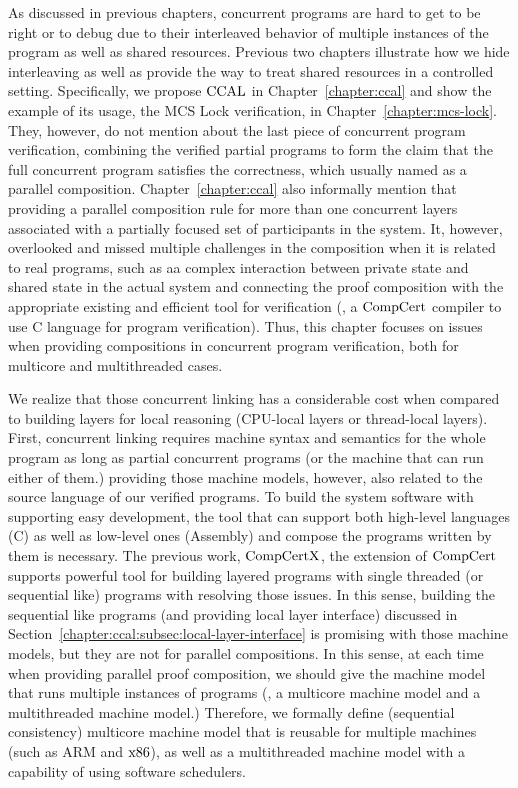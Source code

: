    

As discussed in previous chapters,  concurrent programs are hard to get to be right or to debug due to their interleaved behavior of multiple instances of the program as well as shared resources. 
Previous two chapters illustrate how we hide interleaving as well as provide the way to treat shared resources in a controlled setting. 
Specifically, we propose  $\mathrm{CCAL}$ in Chapter~\ref{chapter:ccal} and show the example of its usage, the MCS Lock verification, in Chapter~\ref{chapter:mcs-lock}.
They, however, do not mention about the last piece of concurrent program verification, 
combining the verified partial programs to form the claim that the full concurrent program satisfies the correctness, 
which usually named as a parallel composition. 
Chapter~\ref{chapter:ccal} also informally mention that providing a  parallel composition rule for more than one
concurrent layers associated with a partially focused set of participants in the system. 
It, however, overlooked and missed multiple challenges in the composition when it is related to real programs,
such as aa complex interaction between private state and shared state in the actual system
and connecting the proof composition with the appropriate existing and efficient tool for verification (\ie, a $\mathrm{CompCert}$ compiler to use C language for program verification).
Thus, this chapter focuses on  issues when providing compositions in concurrent program verification,
both for multicore and multithreaded cases.

We realize that those concurrent linking has a considerable cost when compared to building layers for local reasoning (CPU-local layers or thread-local layers).
First, concurrent linking requires machine syntax and semantics 
for the whole program as long as partial concurrent programs (or the machine that can run either of them.)
providing those machine models, however, also related to the source language of our verified programs.
To build the system software with supporting easy development, 
the tool that can support both high-level languages (C) as well as low-level ones (Assembly) and 
compose the programs written by them is necessary.
The previous work, $\mathrm{CompCertX}$, the extension of $\mathrm{CompCert}$
supports powerful tool for building layered programs with single threaded (or sequential like) programs with 
resolving those issues.
In this sense, 
building the sequential like programs (and providing local layer interface) discussed in Section~\ref{chapter:ccal:subsec:local-layer-interface} 
is promising with those machine models,
but they are not for parallel compositions. 
In this sense, at each time when providing parallel proof composition, 
we should give the machine model that runs multiple instances of programs (\ie, a multicore machine model and a multithreaded machine model.) 
Therefore, we  formally define (sequential consistency) multicore machine model that is reusable for multiple 
machines (such as ARM and $\mathrm{x86}$),  
as well as a multithreaded machine model with a capability of using software schedulers. 

